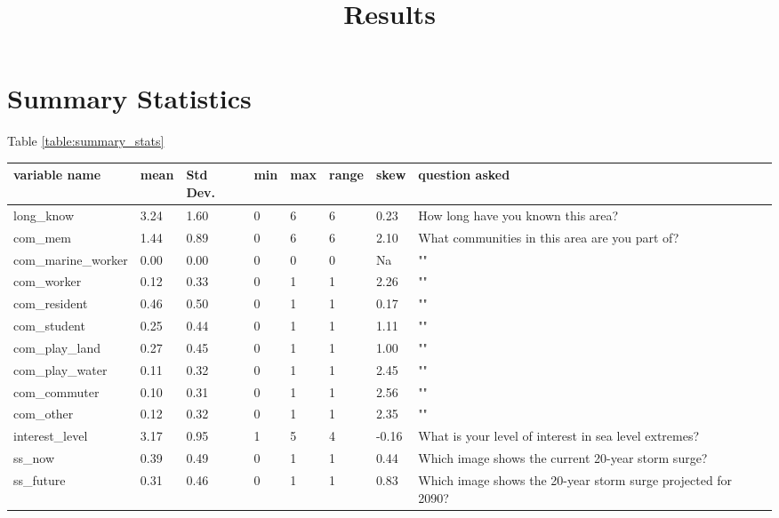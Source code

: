 

\title{Results}


\section{Summary Statistics }


Table \ref{table:summary_stats}

\begin{center}
\begin{table}[!ht]
    \centering
    \begin{tabular}{|l|l|l|l|l|l|l|l|}
    \hline
        variable name & mean & Std Dev. & min & max & range & skew & question asked \\ \hline
        long\_know & 3.24 & 1.60 & 0 & 6 & 6 & 0.23 & How long have you known this area? \\ \hline
        com\_mem & 1.44 & 0.89 & 0 & 6 & 6 & 2.10 & What communities in this area are you part of? \\ \hline
        com\_marine\_worker & 0.00 & 0.00 & 0 & 0 & 0 & Na & "" \\ \hline
        com\_worker & 0.12 & 0.33 & 0 & 1 & 1 & 2.26 & "" \\ \hline
        com\_resident & 0.46 & 0.50 & 0 & 1 & 1 & 0.17 & "" \\ \hline
        com\_student & 0.25 & 0.44 & 0 & 1 & 1 & 1.11 & "" \\ \hline
        com\_play\_land & 0.27 & 0.45 & 0 & 1 & 1 & 1.00 & "" \\ \hline
        com\_play\_water & 0.11 & 0.32 & 0 & 1 & 1 & 2.45 & "" \\ \hline
        com\_commuter & 0.10 & 0.31 & 0 & 1 & 1 & 2.56 & "" \\ \hline
        com\_other & 0.12 & 0.32 & 0 & 1 & 1 & 2.35 & "" \\ \hline
        interest\_level & 3.17 & 0.95 & 1 & 5 & 4 & -0.16 & What is your level of interest in sea level extremes? \\ \hline
        ss\_now & 0.39 & 0.49 & 0 & 1 & 1 & 0.44 & Which image shows the current 20-year storm surge? \\ \hline
        ss\_future & 0.31 & 0.46 & 0 & 1 & 1 & 0.83 & Which image shows the 20-year storm surge projected for 2090? \\ \hline

\end{tabular}
\end{table}
\end{center}

